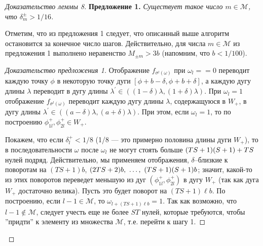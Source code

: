 \documentclass[12pt]{article}
\begin{document}
\begin{proof}[Доказательство леммы 8]
\textbf{Предложение 1.}
\textit{
Существует такое число $m\in\mathcal M$, что $\delta^\pm_m>1/16$.
}

Отметим, что из предложения 1 следует, что описанный выше алгоритм остановится за конечное число шагов. Действительно, для числа $m\in\mathcal{M}$ из предложения 1 выполнено неравенство $M_{\pm m}>3b$ 
(напомним, что $b<1/100$).

\begin{proof}[Доказательство предложения 1] 
Отображение $f_{\sigma^l(\omega)}$ при $\omega_l=\allowbreak=0$ переводит каждую точку $\phi$ в некоторую точку дуги $[\phi+b-\delta,\phi+b+\delta]$, а каждую дугу длины $\lambda$ переводит в дугу длины $\lambda^\prime\in((1-\delta)\lambda,(1+\delta)\lambda)$. При $\omega_l=1$ отображение $f_{\sigma^l(\omega)}$ переводит каждую дугу длины $\lambda$, содержащуюся в $W_+$, в дугу длины $\lambda^\prime\in((a-\delta)\lambda,(a+\delta)\lambda)$. При этом, если $\omega_l=1$, то по построению $\phi^+_{1l},\phi^+_{2l}\in W_+$.

Покажем, что если $\delta^+_l<1/8$ (1/8 --- это примерно половина длины дуги $W_+$), то в последовательности $\omega$ после $\omega_l$ не могут стоять больше $(TS+1)(S+\nobreak1)+TS$ нулей подряд. Действительно, мы применяем отображения, $\delta$--близкие к поворотам на $(TS+1)b$, $(2TS+\nobreak2)b,\allowbreak\ \ldots,\ (TS+1)(S+1)b$; значит, какой-то из этих поворотов переведет меньшую из дуг $(\phi^+_{1l},\phi^+_{2l})$ в дугу $W_+$ (так как дуга $W_+$ достаточно велика). Пусть это будет поворот на $(TS+1)\ell b$. По построению, если $l-1\in\mathcal{M}$, то $\omega_{l+(TS+1)\ell b}=1$. 
Так как возможно, что $l-1\notin\mathcal{M}$, следует учесть еще не более $ST$ нулей, которые требуются, чтобы ''придти'' к элементу из множества $\mathcal{M}$, т.е. перейти к шагу 1.


\end{proof}
\end{proof}
\end{document}
